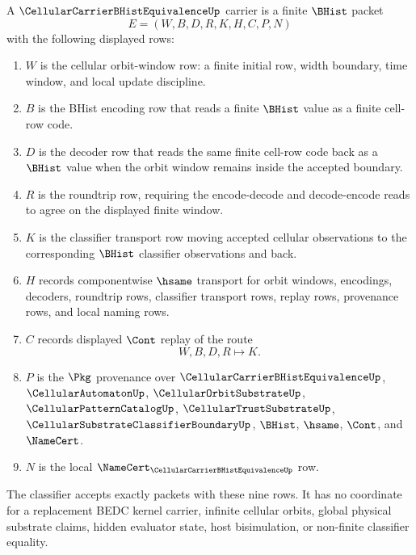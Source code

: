\begin{definition}
\label{def:cellular-carrier-bhist-equivalence-carrier}
A $\CellularCarrierBHistEquivalenceUp$ carrier is a finite $\BHist$ packet
$$
E=(W,B,D,R,K,H,C,P,N)
$$
with the following displayed rows:
\begin{enumerate}
\item $W$ is the cellular orbit-window row: a finite initial row, width boundary, time window, and local update discipline.
\item $B$ is the BHist encoding row that reads a finite $\BHist$ value as a finite cell-row code.
\item $D$ is the decoder row that reads the same finite cell-row code back as a $\BHist$ value when the orbit window remains inside the accepted boundary.
\item $R$ is the roundtrip row, requiring the encode-decode and decode-encode reads to agree on the displayed finite window.
\item $K$ is the classifier transport row moving accepted cellular observations to the corresponding $\BHist$ classifier observations and back.
\item $H$ records componentwise $\hsame$ transport for orbit windows, encodings, decoders, roundtrip rows, classifier transport rows, replay rows, provenance rows, and local naming rows.
\item $C$ records displayed $\Cont$ replay of the route
$$
W,B,D,R \longmapsto K .
$$
\item $P$ is the $\Pkg$ provenance over $\CellularCarrierBHistEquivalenceUp$, $\CellularAutomatonUp$, $\CellularOrbitSubstrateUp$, $\CellularPatternCatalogUp$, $\CellularTrustSubstrateUp$, $\CellularSubstrateClassifierBoundaryUp$, $\BHist$, $\hsame$, $\Cont$, and $\NameCert$.
\item $N$ is the local $\NameCert_{\CellularCarrierBHistEquivalenceUp}$ row.
\end{enumerate}
The classifier accepts exactly packets with these nine rows. It has no coordinate for a replacement BEDC kernel carrier, infinite cellular orbits, global physical substrate claims, hidden evaluator state, host bisimulation, or non-finite classifier equality.
\end{definition}

